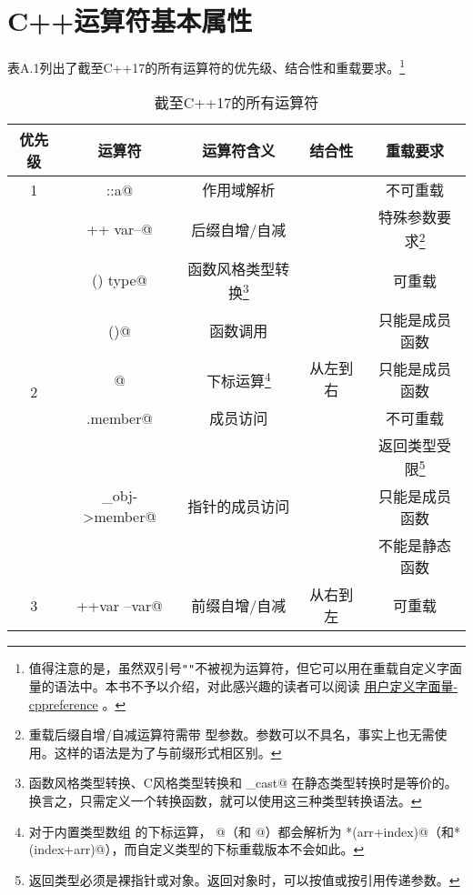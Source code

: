 \chapter{C++运算符基本属性}\label{ch:appendix_A}
表A.1列出了截至C++17的所有运算符的优先级、结合性和重载要求。\footnote{值得注意的是，虽然双引号\texttt{""}不被视为运算符，但它可以用在重载自定义字面量的语法中。本书不予以介绍，对此感兴趣的读者可以阅读 \href{https://zh.cppreference.com/w/cpp/language/user_literal}{用户定义字面量-cppreference} 。}\par%
\begin{longtable}{|c|c|c|c|c|}
\caption{截至C++17的所有运算符}\label{tab:A-1}\\
\hline
\textbf{优先级} & \textbf{运算符} & \textbf{运算符含义} & \textbf{结合性} & \textbf{重载要求}\\
\hline\hline
1 & \lstinline@scope::a@ & 作用域解析 & \multirow{9}{*}{从左到右} & 不可重载\\
\cline{1-3}\cline{5-5}
\multirow{8}{*}{2} & \lstinline@var++ var--@ & 后缀自增/自减 &  & 特殊参数要求\footnote{重载后缀自增/自减运算符需带 \lstinline@int@ 型参数。参数可以不具名，事实上也无需使用。这样的语法是为了与前缀形式相区别。}\\
\cline{2-3}\cline{5-5}
& \lstinline@type() type{}@ & 函数风格类型转换\footnote{函数风格类型转换、C风格类型转换和 \lstinline@static_cast@ 在静态类型转换时是等价的。换言之，只需定义一个转换函数，就可以使用这三种类型转换语法。} &  & 可重载\\
\cline{2-3}\cline{5-5}
& \lstinline@fun()@ & 函数调用 &  & 只能是成员函数\\
\cline{2-3}\cline{5-5}
& \lstinline@arr[index]@ & 下标运算\footnote{对于内置类型数组 \lstinline@arr@ 的下标运算， \lstinline@arr[index]@（和 \lstinline@index[arr]@）都会解析为 \lstinline@*(arr+index)@（和\lstinline@*(index+arr)@），而自定义类型的下标重载版本不会如此。} &  & 只能是成员函数\\
\cline{2-3}\cline{5-5}
& \lstinline@obj.member@ & 成员访问 &  & 不可重载\\
\cline{2-3}\cline{5-5}
& \multirow{3}{*}{\lstinline@p_obj->member@} & \multirow{3}{*}{指针的成员访问} &  & 返回类型受限\footnote{返回类型必须是裸指针或对象。返回对象时，可以按值或按引用传递参数。}\\
&  &  &  & 只能是成员函数\\
&  &  &  & 不能是静态函数\\
\hline
\multirow{9}{*}{3} & \lstinline@++var --var@ & 前缀自增/自减 & \multirow{9}{*}{从右到左} & 可重载\\

\end{longtable}
